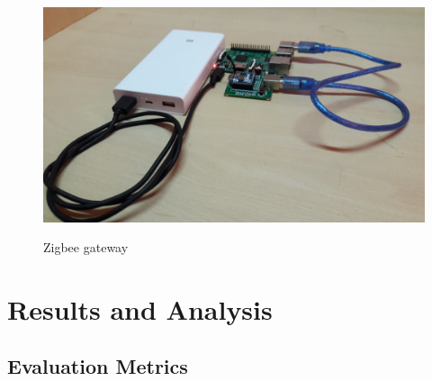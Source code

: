 \begin{figure}[H]
\includegraphics[scale=0.08]{images/gateway.jpg}
\label{fig:10}
\caption{Zigbee gateway}
\end{figure}


\section{Results and Analysis}

\subsection{Evaluation Metrics}

